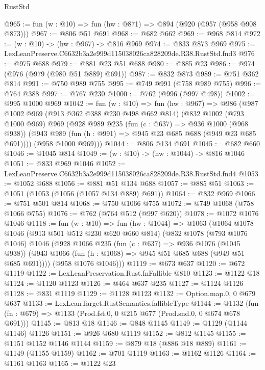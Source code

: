 \begin{lexlean}{RustStd}
\begin{coremodule}
@965 := fun (w : @10) => fun (hw : @871) => @894 (@920 (@957 (@958 @908 @873)))
@967 := @806 @51 @691
@968 := @682 @662
@969 := @968 @814
@972 := (w : @10) -> (hw : @967) -> @816 @969
@974 := @833 @873 @969
@975 := LexLeanPreserve.C6632b3a2e999d115038026ca828209de.R38.RustStd.fnd3
@976 := @975 @688
@979 := @881 @23 @51 @688
@980 := @885 @23
@986 := @974 (@976 (@979 (@980 @51 @889) @691))
@987 := @832 @873
@989 := @751 @362 @814
@991 := @750 @989 @755
@995 := @749 @991 (@758 @989 @755)
@996 := @764 @388
@997 := @767 @230
@1000 := @762 (@996 (@997 @498))
@1002 := @995 @1000 @969
@1042 := fun (w : @10) =>
  fun (hw : @967) =>
  @986
    (@987
      @1002
      @969
      (@913 @362 @388 @230 @498 @662 @814)
      (@832
        @1002
        (@793 @1000 @969)
        @969
        (@928
          @989
          @235
          (fun (c : @637) => @936 @1000 (@968 @938))
          (@943 @989 (fun (h : @991) => @945 @23 @685 @688 (@949 @23 @685 @691))))
        (@958 @1000 @969)))
@1044 := @806 @134 @691
@1045 := @682 @660
@1046 := @1045 @814
@1049 := (w : @10) -> (hw : @1044) -> @816 @1046
@1051 := @833 @969 @1046
@1052 := LexLeanPreserve.C6632b3a2e999d115038026ca828209de.R38.RustStd.fnd4
@1053 := @1052 @688
@1056 := @881 @51 @134 @688
@1057 := @885 @51
@1063 := @1051 (@1053 (@1056 (@1057 @134 @889) @691))
@1064 := @832 @969
@1066 := @751 @501 @814
@1068 := @750 @1066 @755
@1072 := @749 @1068 (@758 @1066 @755)
@1076 := @762 (@764 @512 (@997 @620))
@1078 := @1072 @1076 @1046
@1118 := fun (w : @10) =>
  fun (hw : @1044) =>
  @1063
    (@1064
      @1078
      @1046
      (@913 @501 @512 @230 @620 @660 @814)
      (@832
        @1078
        (@793 @1076 @1046)
        @1046
        (@928
          @1066
          @235
          (fun (c : @637) => @936 @1076 (@1045 @938))
          (@943 @1066 (fun (h : @1068) => @945 @51 @685 @688 (@949 @51 @685 @691))))
        (@958 @1076 @1046)))
@1119 := @673 @637
@1120 := @672 @1119
@1122 := LexLeanPreservation.Rust.fnFallible @810
@1123 := @1122 @18
@1124 := @1120 @1123
@1126 := @464 @637 @235
@1127 := @1124 @1126
@1128 := @831 @1119
@1129 := @1128 @1123
@1132 := Option.map.{0, 0} @679 @637
@1133 := LexLeanTarget.RustSemantics.fallibleType
@1144 := @1132
    (fun (fn : @679) => @1133 (Prod.fst.{0, 0} @215 @677 (Prod.snd.{0, 0} @674 @678 @691)))
@1145 := @813 @18
@1146 := @848 @1145
@1149 := @1129 (@1144 @1146) @1126
@1151 := @926 @680 @1119
@1152 := @812 @1145
@1155 := @1151 @1152 @1146 @1144
@1159 := @879 @18 (@886 @18 @889)
@1161 := @1149 (@1155 @1159)
@1162 := @701 @1119
@1163 := @1162 @1126
@1164 := @1161 @1163
@1165 := @1122 @23

\end{coremodule}
\end{lexlean}

